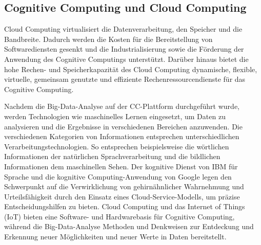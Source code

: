 \subsection{Cognitive Computing und Cloud Computing}

Cloud Computing virtualisiert die Datenverarbeitung, den Speicher und die Bandbreite. Dadurch werden die Kosten für die Bereitstellung von Softwarediensten gesenkt und die Industrialisierung sowie die Förderung der Anwendung des Cognitive Computings unterstützt. Darüber hinaus bietet die hohe Rechen- und Speicherkapazität des Cloud Computing dynamische, flexible, virtuelle, gemeinsam genutzte und effiziente Rechenressourcendienste für das Cognitive Computing.

Nachdem die Big-Data-Analyse auf der CC-Plattform durchgeführt wurde, werden Technologien wie maschinelles Lernen eingesetzt, um Daten zu analysieren und die Ergebnisse in verschiedenen Bereichen anzuwenden. Die verschiedenen Kategorien von Informationen entsprechen unterschiedlichen Verarbeitungstechnologien. So entsprechen beispielsweise die wörtlichen Informationen der natürlichen Sprachverarbeitung und die bildlichen Informationen dem maschinellen Sehen. Der kognitive Dienst von IBM für Sprache und die kognitive Computing-Anwendung von Google legen den Schwerpunkt auf die Verwirklichung von gehirnähnlicher Wahrnehmung und Urteilsfähigkeit durch den Einsatz eines Cloud-Service-Modells, um präzise Entscheidungshilfen zu bieten. Cloud Computing und das Internet of Things (IoT) bieten eine Software- und Hardwarebasis für Cognitive Computing, während die Big-Data-Analyse Methoden und Denkweisen zur Entdeckung und Erkennung neuer Möglichkeiten und neuer Werte in Daten bereitstellt.
